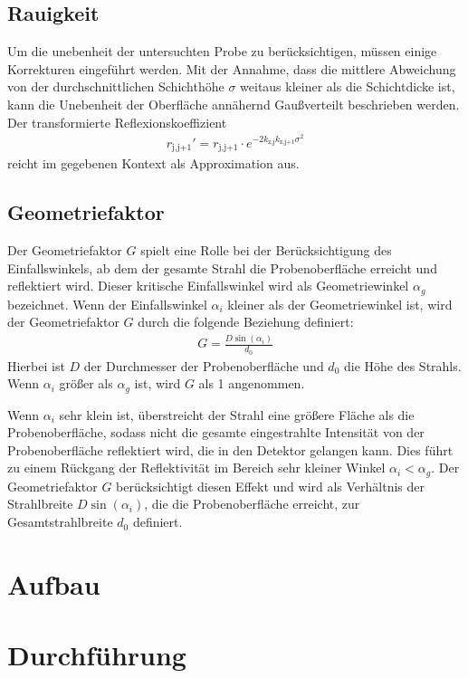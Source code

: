 \documentclass[12pt]{article}
\begin{document}
\subsection{Rauigkeit}{\label{subsec:rauigkeit}}
Um die unebenheit der untersuchten Probe zu berücksichtigen, müssen einige Korrekturen eingeführt werden.
Mit der Annahme, dass die mittlere Abweichung von der durchschnittlichen Schichthöhe $\sigma$ weitaus kleiner als die Schichtdicke ist, kann die Unebenheit der Oberfläche annähernd Gaußverteilt beschrieben werden.
Der transformierte Reflexionskoeffizient
\begin{align}
    r_\text{j,j+1}'=r_\text{j,j+1}\cdot e^{-2k_\text{z,j}k_\text{z,j+1}\sigma^2}
\end{align}
reicht im gegebenen Kontext als Approximation aus.
\subsection{Geometriefaktor}
Der Geometriefaktor $ G $ spielt eine Rolle bei der Berücksichtigung des Einfallswinkels, ab dem der gesamte Strahl die Probenoberfläche erreicht und reflektiert wird. Dieser kritische Einfallswinkel wird als Geometriewinkel $ \alpha_g $ bezeichnet. Wenn der Einfallswinkel $ \alpha_i $ kleiner als der Geometriewinkel ist, wird der Geometriefaktor $ G $ durch die folgende Beziehung definiert:
\begin{align*}
G = \frac{D \sin(\alpha_i)}{d_0}
\end{align*}
Hierbei ist $ D $ der Durchmesser der Probenoberfläche und $ d_0 $ die Höhe des Strahls. Wenn $ \alpha_i $ größer als $ \alpha_g $ ist, wird $ G $ als 1 angenommen.

Wenn $ \alpha_i $ sehr klein ist, überstreicht der Strahl eine größere Fläche als die Probenoberfläche, sodass nicht die gesamte eingestrahlte Intensität von der Probenoberfläche reflektiert wird, die in den Detektor gelangen kann. Dies führt zu einem Rückgang der Reflektivität im Bereich sehr kleiner Winkel $ \alpha_i < \alpha_g $. Der Geometriefaktor $ G $ berücksichtigt diesen Effekt und wird als Verhältnis der Strahlbreite $ D \sin(\alpha_i) $, die die Probenoberfläche erreicht, zur Gesamtstrahlbreite $ d_0 $ definiert.
\section{Aufbau}{\label{sec:aufbau}}

\section{Durchführung}{\label{sec:durchfuehrung}}
\end{document}
